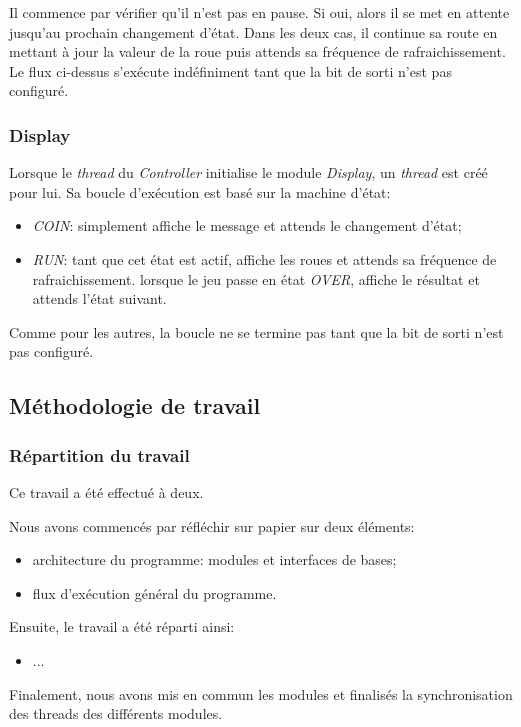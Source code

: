 \documentclass[11pt, a4paper]{article}
\begin{document}
Il commence par vérifier qu'il n'est pas en pause. Si oui, alors il se met en attente jusqu'au prochain changement d'état.
Dans les deux cas, il continue sa route en mettant à jour la valeur de la roue puis attends sa fréquence de rafraichissement. \\

Le flux ci-dessus s'exécute indéfiniment tant que la bit de sorti n'est pas configuré.

\subsubsection{Display}
Lorsque  le \textit{thread} du \textit{Controller} initialise le module \textit{Display},
un \textit{thread} est créé pour lui. Sa boucle d'exécution est basé sur la machine d'état:
\begin{itemize}
    \item \textit{COIN}: simplement affiche le message et attends le changement d'état;
    \item \textit{RUN}: tant que cet état est actif, affiche les roues et attends sa fréquence de rafraichissement.
                        lorsque le jeu passe en état \textit{OVER}, affiche le résultat et attends l'état suivant. \\
\end{itemize}

Comme pour les autres, la boucle ne se termine pas tant que la bit de sorti n'est pas configuré.

\newpage

\subsection{Méthodologie de travail}
\subsubsection{Répartition du travail}

Ce travail a été effectué à deux.

Nous avons commencés par réfléchir sur papier sur deux éléments:

\begin{itemize}
    \item architecture du programme: modules et interfaces de bases;
    \item flux d'exécution général du programme. \\
\end{itemize}

Ensuite, le travail a été réparti ainsi:
\begin{itemize}
    \item ... \\
\end{itemize}

Finalement, nous avons mis en commun les modules et finalisés la synchronisation des threads des différents modules.

\newpage
\end{document}
